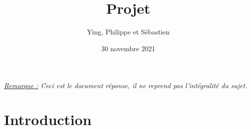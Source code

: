 \documentclass{sebaClass}
\title{Projet}
\author{Ying, Philippe et Sébastien}
\date{30 novembre 2021}
\begin{document}
\maketitle
\tableofcontents

\vspace*{\fill}
\textit{\underline{Remarque :} Ceci est le document réponse, il ne reprend pas l'intégralité du sujet.}
\newpage

\section{Introduction}

\end{document}
